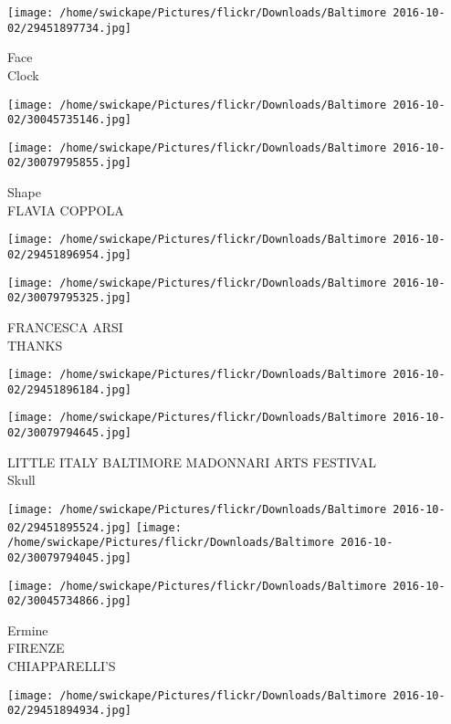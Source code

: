 \documentclass[10pt,letterpaper]{article}
\begin{document}
\vspace{0.25in}
\texttt{[image: /home/swickape/Pictures/flickr/Downloads/Baltimore 2016-10-02/29451897734.jpg]}

Face\\
Clock
\pagebreak

\texttt{[image: /home/swickape/Pictures/flickr/Downloads/Baltimore 2016-10-02/30045735146.jpg]}

\vspace{0.25in}
\texttt{[image: /home/swickape/Pictures/flickr/Downloads/Baltimore 2016-10-02/30079795855.jpg]}

Shape\\
FLAVIA COPPOLA
\pagebreak

\texttt{[image: /home/swickape/Pictures/flickr/Downloads/Baltimore 2016-10-02/29451896954.jpg]}

\vspace{0.25in}
\texttt{[image: /home/swickape/Pictures/flickr/Downloads/Baltimore 2016-10-02/30079795325.jpg]}

FRANCESCA ARSI\\
THANKS
\pagebreak

\texttt{[image: /home/swickape/Pictures/flickr/Downloads/Baltimore 2016-10-02/29451896184.jpg]}

\vspace{0.25in}
\texttt{[image: /home/swickape/Pictures/flickr/Downloads/Baltimore 2016-10-02/30079794645.jpg]}

LITTLE ITALY BALTIMORE MADONNARI ARTS FESTIVAL\\
Skull
\pagebreak

\texttt{[image: /home/swickape/Pictures/flickr/Downloads/Baltimore 2016-10-02/29451895524.jpg]}
\texttt{[image: /home/swickape/Pictures/flickr/Downloads/Baltimore 2016-10-02/30079794045.jpg]}

\vspace{0.25in}
\texttt{[image: /home/swickape/Pictures/flickr/Downloads/Baltimore 2016-10-02/30045734866.jpg]}

Ermine\\
FIRENZE\\
CHIAPPARELLI'S
\pagebreak

\texttt{[image: /home/swickape/Pictures/flickr/Downloads/Baltimore 2016-10-02/29451894934.jpg]}
\end{document}
